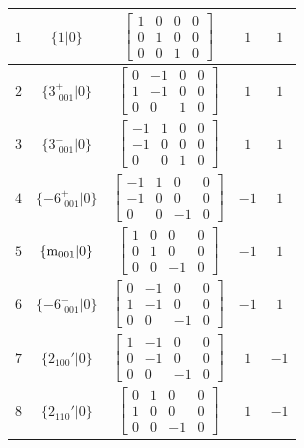\documentclass[fleqn,8pt]{jsarticle}
\begin{document}
\begin{longtable}{ccccc}
$ 1 $ & $ \{1|0\} $ & $ \begin{bmatrix} 1 & 0 & 0 & 0 \\ 0 & 1 & 0 & 0 \\ 0 & 0 & 1 & 0 \end{bmatrix} $ & $ 1 $ & $ 1 $ \\ \hline
$ 2 $ & $ \{3^{+}_{\,\,001}|0\} $ & $ \begin{bmatrix} 0 & -1 & 0 & 0 \\ 1 & -1 & 0 & 0 \\ 0 & 0 & 1 & 0 \end{bmatrix} $ & $ 1 $ & $ 1 $ \\ \hline
$ 3 $ & $ \{3^{-}_{\,\,001}|0\} $ & $ \begin{bmatrix} -1 & 1 & 0 & 0 \\ -1 & 0 & 0 & 0 \\ 0 & 0 & 1 & 0 \end{bmatrix} $ & $ 1 $ & $ 1 $ \\ \hline
$ 4 $ & $ \{-6^{+}_{\,\,001}|0\} $ & $ \begin{bmatrix} -1 & 1 & 0 & 0 \\ -1 & 0 & 0 & 0 \\ 0 & 0 & -1 & 0 \end{bmatrix} $ & $ -1 $ & $ 1 $ \\ \hline
$ 5 $ & $ \{{\rm m}_{001}|0\} $ & $ \begin{bmatrix} 1 & 0 & 0 & 0 \\ 0 & 1 & 0 & 0 \\ 0 & 0 & -1 & 0 \end{bmatrix} $ & $ -1 $ & $ 1 $ \\ \hline
$ 6 $ & $ \{-6^{-}_{\,\,001}|0\} $ & $ \begin{bmatrix} 0 & -1 & 0 & 0 \\ 1 & -1 & 0 & 0 \\ 0 & 0 & -1 & 0 \end{bmatrix} $ & $ -1 $ & $ 1 $ \\ \hline
$ 7 $ & $ \{2{}_{100}{}'|0\} $ & $ \begin{bmatrix} 1 & -1 & 0 & 0 \\ 0 & -1 & 0 & 0 \\ 0 & 0 & -1 & 0 \end{bmatrix} $ & $ 1 $ & $ -1 $ \\ \hline
$ 8 $ & $ \{2{}_{110}{}'|0\} $ & $ \begin{bmatrix} 0 & 1 & 0 & 0 \\ 1 & 0 & 0 & 0 \\ 0 & 0 & -1 & 0 \end{bmatrix} $ & $ 1 $ & $ -1 $ \\ \hline

\end{longtable}
\end{document}
